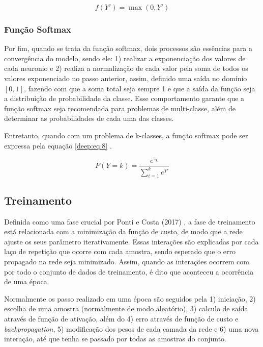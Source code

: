 \begin{equation}
    \label{deep:eq:7}
    f(Y') = \max(0,Y')
\end{equation}

\subsubsection{Função Softmax}
\label{deep:soft}
Por fim, quando se trata da função softmax, dois processos são essências para a convergência do modelo, sendo ele: 1) realizar a exponenciação dos valores de cada neuronio e 2) realiza a normalização de cada valor pela soma de todos os valores exponenciado no passo anterior, assim, definido uma saída no domínio $[0,1]$, fazendo com que a soma total seja sempre 1 \cite{kotu2018data} e que a saída da função seja a distribuição de probabilidade da classe. Esse comportamento garante que a função softmax seja recomendada para problemas de multi-classe, além de determinar as probabilidades de cada uma das classes.

Entretanto, quando com um problema de k-classes, a função softmax pode ser expressa pela equação \ref{deep:eq:8} \cite{kotu2018data}.

\begin{equation}
    \label{deep:eq:8}
    P(Y = k) = \frac{e^{z_k}}{\sum_{i=1}^{k} e^{Y'}}
\end{equation}


\subsection{Treinamento}
\label{deep:train}

Definida como uma fase crucial por Ponti e Costa (2017) \cite{ponti2018funciona}, a fase de treinamento está relacionada com a minimização da função de custo, de modo que a rede ajuste os seus parâmetro iterativamente. Essas interações são explicadas por cada laço de repetição que ocorre com cada amostra, sendo esperado que o erro propagado na rede seja minimizado. Assim, quando as interações ocorrem com por todo o conjunto de dados de treinamento, é dito que aconteceu a ocorrência de uma época.

Normalmente os passo realizado em uma época são seguidos pela 1) iniciação, 2) escolha de uma amostra (normalmente de modo aleatório), 3) calculo de saída através de função de ativação, além do 4) erro através de função de custo e \textit{backpropagation}, 5) modificação dos pesos de cada camada da rede e 6) uma nova interação, até que tenha se passado por todas as amostras do conjunto.

